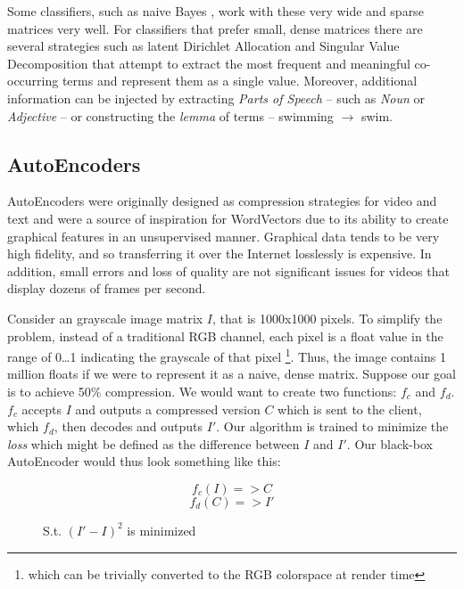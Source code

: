 \par{
Some classifiers, such as naive Bayes \cite{rish2001empirical}, work with these very wide and sparse matrices very well. For classifiers that prefer small, dense matrices there are several strategies such as latent Dirichlet Allocation \cite{blei2003latent} and Singular Value Decomposition \cite{} that attempt to extract the most frequent and meaningful co-occurring terms and represent them as a single value. Moreover, additional information can be injected by extracting \textit{Parts of Speech} -- such as \textit{Noun} or \textit{Adjective} -- or constructing the \textit{lemma} of terms -- swimming $\rightarrow$ swim. 
}

\subsection{AutoEncoders}

\par{
AutoEncoders were originally designed as compression strategies for video and text and were a source of inspiration for WordVectors due to its ability to create graphical features in an unsupervised manner. Graphical data tends to be very high fidelity, and so transferring it over the Internet losslessly is expensive. In addition, small errors and loss of quality are not significant issues for videos that display dozens of frames per second.
}
\par{
Consider an grayscale image matrix $I$, that is \textsf{1000x1000} pixels. To simplify the problem, instead of a traditional RGB channel, each pixel is a float value in the range of 0\ldots1 indicating the grayscale of that pixel \footnote{which can be trivially converted to the RGB colorspace at render time}. Thus, the image contains 1 million floats if we were to represent it as a naive, dense matrix. Suppose our goal is to achieve 50\% compression. We would want to create two functions: $f_c$ and $f_d$. $f_c$ accepts $I$ and outputs a compressed version $C$ which is sent to the client, which $f_d$, then decodes and outputs $I'$. Our algorithm is trained to minimize the \textit{loss} which might be defined as the difference between $I$ and $I'$. Our black-box AutoEncoder would thus look something like this:
}

\begin{figure}
\[f_c(I) => C \]
\[ f_d(C) => I' \]
\caption{S.t. $(I' - I)^2$ is minimized}
\end{figure}

